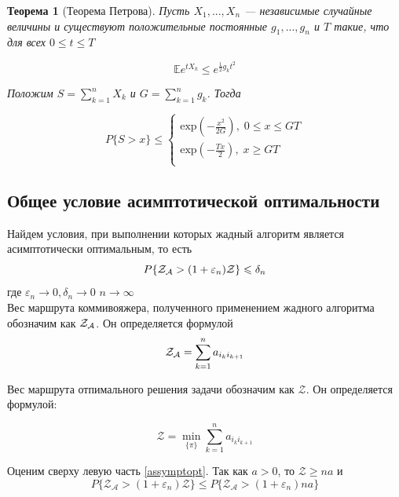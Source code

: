 \documentclass[a4paper, 14pt]{extarticle}
\numberwithin{equation}{section}
\newtheorem{theorem}{Теорема}[section]
\begin{document}
\begin{theorem}[Теорема Петрова]
\label{petrovtheorem}
Пусть $X_1,...,X_n$ — независимые случайные величины и
существуют положительные постоянные $g_1,...,g_n$ и $T$ такие, что для всех $0 \leqslant t \leqslant T$

\begin{equation*}
\mathbb {E}e^{tX_k} \leqslant e^{\frac{1}{2} g_k t^{2}}
\end{equation*}

Положим $S=\sum_{k=1}^{n} X_k $ и $G=\sum_{k=1}^{n} g_k $. Тогда

\begin{equation*}
P\{S > x\} \leqslant 
\begin{cases}
   \mathrm{exp} (-\frac{x^{2}}{2G}), \; 0 \leqslant x \leqslant GT\\
   \mathrm{exp} (-\frac{Tx}{2}), \; x\geqslant GT \\
 \end{cases}
\end{equation*}
\end{theorem}


\subsection{Общее условие асимптотической оптимальности}

Найдем условия, при выполнении которых жадный алгоритм является асимптотически оптимальным, то есть
\begin{equation}\label{assymptopt}
P\{\text{$\mathcal{Z_{A}}$} > (1+\varepsilon_n)\mathcal{Z}\}\leqslant \delta_n
\end{equation}
где $\varepsilon_n \rightarrow 0, \delta_n \rightarrow 0$ $n \rightarrow \infty$\\

Вес маршрута коммивояжера, полученного применением жадного алгоритма обозначим как $\text{$\mathcal{Z_{A}}$}$. Он определяется формулой
\begin{equation*}
\text{$\mathcal{Z_{A}}$} = \sum_{k=1}^n a_{i_k i_{k+1}}
\end{equation*}

Вес маршрута отпимального решения задачи обозначим как $\mathcal{Z}$. Он определяется формулой:

\begin{equation*}
\mathcal{Z} = \min_{\{ \pi \}} \sum_{k=1}^n a_{i_k i_{k+1}}
\end{equation*}


Оценим сверху левую часть \eqref{assymptopt}. Так как $a>0$, то $\mathcal{Z} \geqslant na$ и 
\begin{equation}\label{4}
P\{\mathcal{Z_{A}} > (1+\varepsilon_n)\mathcal{Z}\}\leqslant P\{\mathcal{Z_{A}} > (1+\varepsilon_n)na\}
\end{equation}
\end{document}
